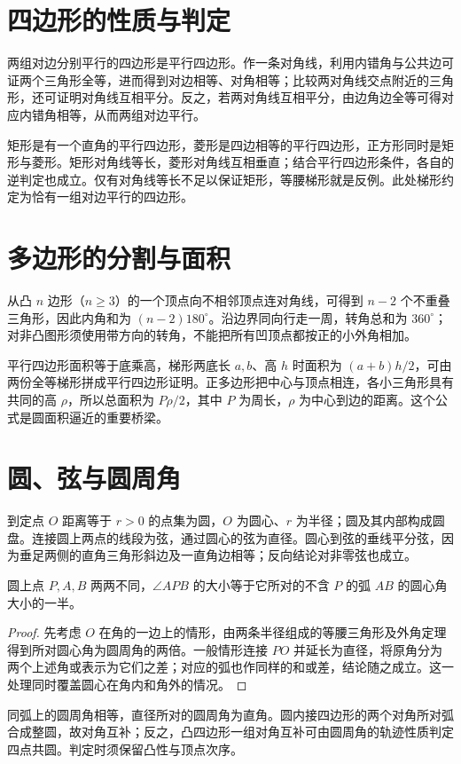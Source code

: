 \documentclass[UTF8]{ctexbook}
\begin{document}
\section{四边形的性质与判定}
两组对边分别平行的四边形是平行四边形。作一条对角线，利用内错角与公共边可证两个三角形全等，进而得到对边相等、对角相等；比较两对角线交点附近的三角形，还可证明对角线互相平分。反之，若两对角线互相平分，由边角边全等可得对应内错角相等，从而两组对边平行。

矩形是有一个直角的平行四边形，菱形是四边相等的平行四边形，正方形同时是矩形与菱形。矩形对角线等长，菱形对角线互相垂直；结合平行四边形条件，各自的逆判定也成立。仅有对角线等长不足以保证矩形，等腰梯形就是反例。此处梯形约定为恰有一组对边平行的四边形。

\section{多边形的分割与面积}
从凸 $n$ 边形（$n\ge3$）的一个顶点向不相邻顶点连对角线，可得到 $n-2$ 个不重叠三角形，因此内角和为 $(n-2)180^\circ$。沿边界同向行走一周，转角总和为 $360^\circ$；对非凸图形须使用带方向的转角，不能把所有凹顶点都按正的小外角相加。

平行四边形面积等于底乘高，梯形两底长 $a,b$、高 $h$ 时面积为 $(a+b)h/2$，可由两份全等梯形拼成平行四边形证明。正多边形把中心与顶点相连，各小三角形具有共同的高 $\rho$，所以总面积为 $P\rho/2$，其中 $P$ 为周长，$\rho$ 为中心到边的距离。这个公式是圆面积逼近的重要桥梁。

\section{圆、弦与圆周角}
到定点 $O$ 距离等于 $r>0$ 的点集为圆，$O$ 为圆心、$r$ 为半径；圆及其内部构成圆盘。连接圆上两点的线段为弦，通过圆心的弦为直径。圆心到弦的垂线平分弦，因为垂足两侧的直角三角形斜边及一直角边相等；反向结论对非零弦也成立。

\begin{theorem}[圆周角定理]
圆上点 $P,A,B$ 两两不同，$\angle APB$ 的大小等于它所对的不含 $P$ 的弧 $AB$ 的圆心角大小的一半。
\end{theorem}
\begin{proof}
先考虑 $O$ 在角的一边上的情形，由两条半径组成的等腰三角形及外角定理得到所对圆心角为圆周角的两倍。一般情形连接 $PO$ 并延长为直径，将原角分为两个上述角或表示为它们之差；对应的弧也作同样的和或差，结论随之成立。这一处理同时覆盖圆心在角内和角外的情况。
\end{proof}
同弧上的圆周角相等，直径所对的圆周角为直角。圆内接四边形的两个对角所对弧合成整圆，故对角互补；反之，凸四边形一组对角互补可由圆周角的轨迹性质判定四点共圆。判定时须保留凸性与顶点次序。
\end{document}
